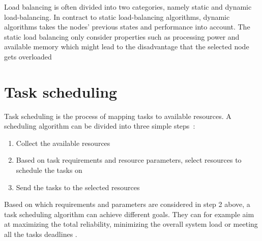\documentclass{cslthse-msc}
\begin{document}
Load balancing is often divided into two categories, namely static and dynamic load-balancing. In contract to static load-balancing algorithms, dynamic algorithms takes the nodes' previous states and performance into account. The static load balancing only consider properties such as processing power and available memory which might lead to the disadvantage that the selected node gets overloaded~\cite{perfAnalysisLoadCloud}

\section{Task scheduling} \label{sec:background_task_sched}
Task scheduling is the process of mapping tasks to available resources. A scheduling algorithm can be divided into three simple steps~\cite{optSchedCloud}:

\begin{enumerate}
	\item Collect the available resources
	\item Based on task requirements and resource parameters, select resources to schedule the tasks on
	\item Send the tasks to the selected resources
\end{enumerate}

Based on which requirements and parameters are considered in step 2 above, a task scheduling algorithm can achieve different goals. They can for example aim at maximizing the total reliability, minimizing the overall system load or meeting all the tasks deadlines \cite{schedulingSurvey}. 
\end{document}
